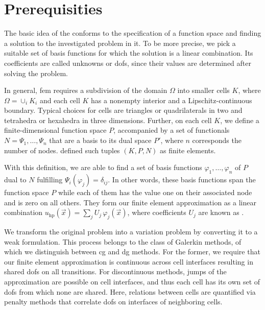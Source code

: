 \section{Prerequisities}
\label{sec:prerequisities}


The basic idea of the  conforms to the specification of a function space and finding a solution to the investigated problem in it. To be more precise, we pick a suitable set of basis functions for which the solution is a linear combination. Its coefficients are called unknowns or \glspl{dof}, since their values are determined after solving the problem.

In general, \gls{fem} requires a subdivision of the domain $\Omega$ into smaller cells $K$, where $\Omega = \cup_{i} K_i$ and each cell $K$ has a nonempty interior and a Lipschitz-continuous boundary. Typical choices for cells are triangles or quadrilaterals in two and tetrahedra or hexahedra in three dimensions.
Further, on each cell $K$, we define a finite-dimensional function space $P$, accompanied by a set of functionals $N = {\Psi_1, \dots, \Psi_n}$ that are a basis to its dual space $P'$, where $n$ corresponds the number of nodes. \textcite[Sec.~2.1]{ciarlet1978} defined such tuples $(K,P,N)$ as finite elements.

With this definition, we are able to find a set of basis functions ${\varphi_1, \dots, \varphi_n}$ of $P$ dual to $N$ fulfilling $\Psi_i(\varphi_j) = \delta_{ij}$. In other words, these basis functions span the function space $P$ while each of them has the value one on their associated node and is zero on all others. They form our finite element approximation as a linear combination $u_{\text{hp}}(\vec{x}) = \sum_{j} U_j \, \varphi_j(\vec{x})$, where coefficients $U_j$ are known as .

We transform the original problem into a variation problem by converting it to a weak formulation. This process belongs to the class of Galerkin methods, of which we distinguish between \gls{cg} and \gls{dg} methods. For the former, we require that our finite element approximation is continuous across cell interfaces resulting in shared \glspl{dof} on all transitions. For discontinuous methods, jumps of the approximation are possible on cell interfaces, and thus each cell has its own set of \glspl{dof} from which none are shared. Here, relations between cells are quantified via penalty methods that correlate \glspl{dof} on interfaces of neighboring cells.

